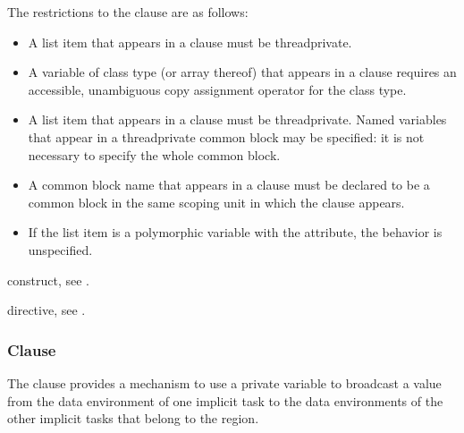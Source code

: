 \restrictions
The restrictions to the  clause are as follows:

\begin{ccppspecific}
\begin{itemize}
\item A list item that appears in a  clause must be threadprivate.
\item A variable of class type (or array thereof) that appears in a  
      clause requires an accessible, unambiguous copy assignment operator for the 
      class type.
\end{itemize}
\end{ccppspecific}

\begin{fortranspecific}
\begin{itemize}
\item A list item that appears in a  clause must be threadprivate. 
      Named variables that appear in a threadprivate common block may be specified: 
      it is not necessary to specify the whole common block.
\item A common block name that appears in a  clause must be declared 
      to be a common block in the same scoping unit in which the  
      clause appears.
\item If the list item is a polymorphic variable with the  
      attribute, the behavior is unspecified.
\end{itemize}
\end{fortranspecific}

\begin{crossrefs}
\item {} construct, see
.

\item {} directive, see
.
\end{crossrefs}



\subsubsection{ Clause}
\label{subsubsec:copyprivate clause}
\summary
The  clause provides a mechanism to use a private variable 
to broadcast a value from the data environment of one implicit task to the data 
environments of the other implicit tasks that belong to the  region.

